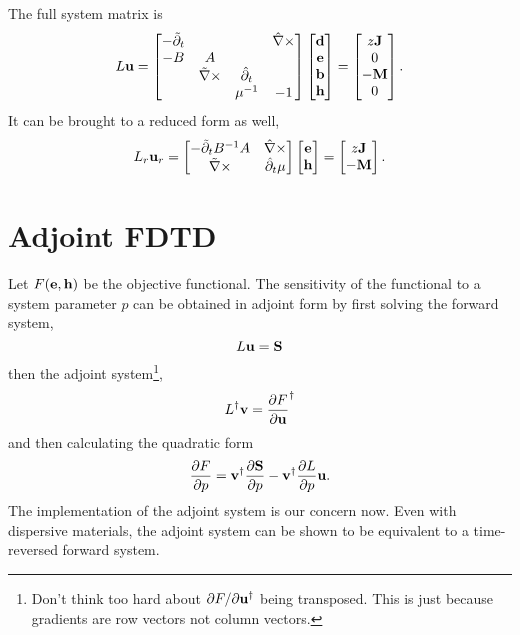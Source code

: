 The full system matrix is
%
\begin{equation}
L \textbf{u} =
\begin{bmatrix}
-\tilde{\partial}_t & & & \hat{\nabla}\times \\
-B & A & & \\
& \tilde{\nabla} \times & \hat{\partial}_t  & \\
& & \mu^{-1} & -1
\end{bmatrix}
\begin{bmatrix}
\textbf{d} \\ \textbf{e} \\ \textbf{b} \\ \textbf{h}
\end{bmatrix}
=
\begin{bmatrix}
z \textbf{J} \\ 0 \\ -\textbf{M} \\ 0 
\end{bmatrix}.
\end{equation}
%
It can be brought to a reduced form as well,
%
\begin{equation}
L_r \textbf{u}_r =
\begin{bmatrix}
-\tilde{\partial}_t B^{-1} A & \hat{\nabla}\times \\
\tilde{\nabla}\times & \hat{\partial}_t \mu
\end{bmatrix}
\begin{bmatrix} \textbf{e} \\ \textbf{h} \end{bmatrix}
=
\begin{bmatrix} z \textbf{J} \\ -\textbf{M} \end{bmatrix}.
\label{eqn:forwardSystem}
\end{equation}



\section{Adjoint FDTD}

Let $F(\textbf{e}, \textbf{h})$ be the objective functional.  The sensitivity of the functional to a system parameter $p$ can be obtained in adjoint form by first solving the forward system,
%
\begin{equation}
L \textbf{u} = \textbf{S}
\end{equation}
%
then the adjoint system\footnote{Don't think too hard about $\partial{F}/\partial{\textbf{u}}^\dagger$ being transposed.  This is just because gradients are row vectors not column vectors.},
%
\begin{equation}
L^\dagger \textbf{v} = \frac{\partial F}{\partial \textbf{u}}^\dagger
\end{equation}
%
and then calculating the quadratic form
%
\begin{equation}
\frac{\partial{F}}{\partial{p}} = \textbf{v}^\dagger \frac{\partial{\textbf{S}}}{\partial{p}} - \textbf{v}^\dagger \frac{\partial{L}}{\partial{p}} \textbf{u}.
\label{eqn:sensitivityEquation}
\end{equation}
%
The implementation of the adjoint system is our concern now.  Even with dispersive materials, the adjoint system can be shown to be equivalent to a time-reversed forward system.

